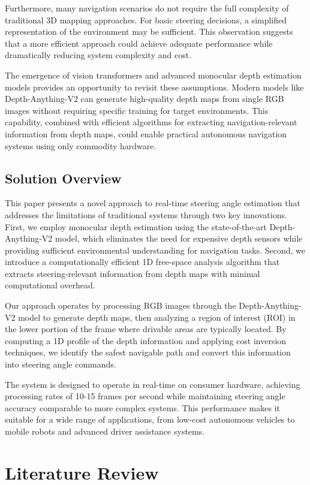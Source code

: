 \documentclass[conference]{IEEEtran}
\begin{document}
Furthermore, many navigation scenarios do not require the full complexity of traditional 3D mapping approaches. For basic steering decisions, a simplified representation of the environment may be sufficient. This observation suggests that a more efficient approach could achieve adequate performance while dramatically reducing system complexity and cost.

The emergence of vision transformers and advanced monocular depth estimation models provides an opportunity to revisit these assumptions. Modern models like Depth-Anything-V2 can generate high-quality depth maps from single RGB images without requiring specific training for target environments. This capability, combined with efficient algorithms for extracting navigation-relevant information from depth maps, could enable practical autonomous navigation systems using only commodity hardware.

\subsection{Solution Overview}
This paper presents a novel approach to real-time steering angle estimation that addresses the limitations of traditional systems through two key innovations. First, we employ monocular depth estimation using the state-of-the-art Depth-Anything-V2 model, which eliminates the need for expensive depth sensors while providing sufficient environmental understanding for navigation tasks. Second, we introduce a computationally efficient 1D free-space analysis algorithm that extracts steering-relevant information from depth maps with minimal computational overhead.

Our approach operates by processing RGB images through the Depth-Anything-V2 model to generate depth maps, then analyzing a region of interest (ROI) in the lower portion of the frame where drivable areas are typically located. By computing a 1D profile of the depth information and applying cost inversion techniques, we identify the safest navigable path and convert this information into steering angle commands.

The system is designed to operate in real-time on consumer hardware, achieving processing rates of 10-15 frames per second while maintaining steering angle accuracy comparable to more complex systems. This performance makes it suitable for a wide range of applications, from low-cost autonomous vehicles to mobile robots and advanced driver assistance systems.

\section{Literature Review}
\end{document}
